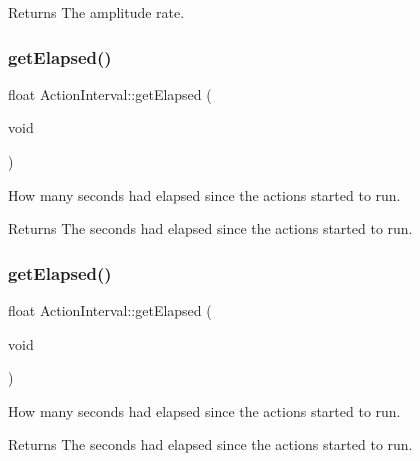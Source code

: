 \begin{DoxyReturn}{Returns}
The amplitude rate. 
\end{DoxyReturn}
\mbox{\label{classActionInterval_ac4c654318b41a008364a93955a791b96}} 
\subsubsection{\texorpdfstring{get\+Elapsed()}{getElapsed()}\hspace{0.1cm}{\footnotesize\ttfamily [1/2]}}
{\footnotesize\ttfamily float Action\+Interval\+::get\+Elapsed (\begin{DoxyParamCaption}\item[{void}]{ }\end{DoxyParamCaption})\hspace{0.3cm}{\ttfamily [inline]}}

How many seconds had elapsed since the actions started to run.

\begin{DoxyReturn}{Returns}
The seconds had elapsed since the actions started to run. 
\end{DoxyReturn}
\mbox{\label{classActionInterval_acc73648af87e0c9c7c64daf266448bdb}} 
\subsubsection{\texorpdfstring{get\+Elapsed()}{getElapsed()}\hspace{0.1cm}{\footnotesize\ttfamily [2/2]}}
{\footnotesize\ttfamily float Action\+Interval\+::get\+Elapsed (\begin{DoxyParamCaption}\item[{void}]{ }\end{DoxyParamCaption})\hspace{0.3cm}{\ttfamily [inline]}}

How many seconds had elapsed since the actions started to run.

\begin{DoxyReturn}{Returns}
The seconds had elapsed since the actions started to run. 
\end{DoxyReturn}
\mbox{\label{classActionInterval_a466ff6a3a5f95e47d4d01bfa4775290d}} 
